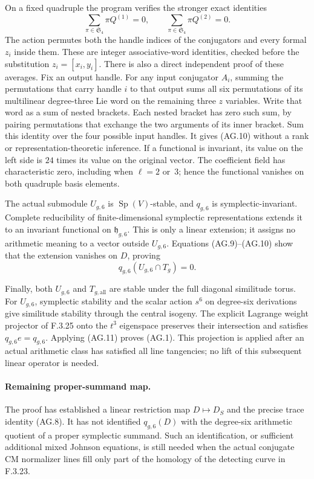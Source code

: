 On a fixed quadruple the program verifies the
stronger exact identities
\[
       \sum_{\pi\in\mathfrak S_4}\pi Q^{(1)}=0,
       \qquad
       \sum_{\pi\in\mathfrak S_4}\pi Q^{(2)}=0.            \tag{AG.10}
\]
The action permutes both the handle indices of
the conjugators and every formal $z_i$ inside
them. These are integer associative-word
identities, checked before the substitution
$z_i=[x_i,y_i]$. There is also a direct independent
proof of these averages. Fix an output handle. For
any input conjugator $A_i$, summing the permutations
that carry handle $i$ to that output sums all six
permutations of its multilinear degree-three Lie
word on the remaining three $z$ variables. Write
that word as a sum of nested brackets. Each nested
bracket has zero such sum, by pairing permutations
that exchange the two arguments of its inner
bracket. Sum this identity over the four possible
input handles. It gives (AG.10) without a rank or
representation-theoretic inference. If a functional
is invariant, its value on the left side is $24$
times its value on the original vector. The coefficient
field has characteristic zero, including when
$\ell=2$ or~3; hence the functional vanishes
on both quadruple basis elements.

The actual submodule $U_{g,6}$ is
$\operatorname{Sp}(V)$-stable, and $q_{g,6}$
is symplectic-invariant. Complete reducibility
of finite-dimensional symplectic representations
extends it to an invariant functional on
$\mathfrak h_{g,6}$. This is only a linear
extension; it assigns no arithmetic meaning
to a vector outside $U_{g,6}$. Equations
(AG.9)--(AG.10) show that the extension
vanishes on $D$, proving
\[
                         q_{g,6}(U_{g,6}\cap T_g)=0.
                                                               \tag{AG.11}
\]

Finally, both $U_{g,6}$ and $T_{g,\mathrm{all}}$
are stable under the full diagonal similitude
torus. For $U_{g,6}$, symplectic stability and
the scalar action $s^6$ on degree-six derivations
give similitude stability through the central
isogeny. The explicit Lagrange weight projector
of F.3.25 onto the $t^3$ eigenspace preserves
their intersection and satisfies $q_{g,6}e=q_{g,6}$.
Applying (AG.11) proves (AG.1). This projection
is applied after an actual arithmetic class
has satisfied all line tangencies; no lift
of this subsequent linear operator is needed.

\paragraph{Remaining proper-summand map.}
The proof has established a linear restriction
map $D\mapsto D_S$ and the precise trace identity
(AG.8). It has not identified $q_{g,6}(D)$ with
the degree-six arithmetic quotient of a proper
symplectic summand. Such an identification, or
sufficient additional mixed Johnson equations,
is still needed when the actual conjugate CM
normalizer lines fill only part of the homology
of the detecting curve in F.3.23.
